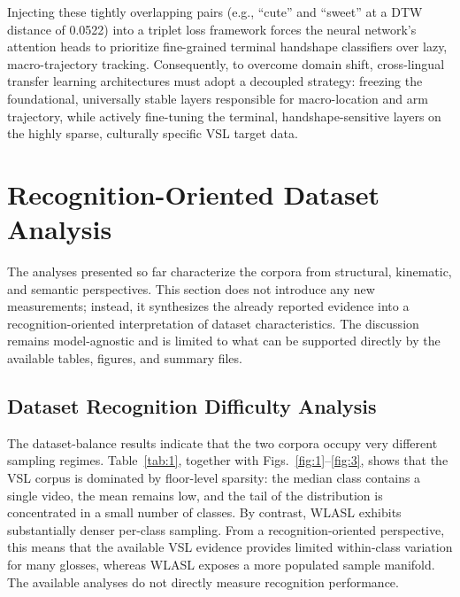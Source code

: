 \documentclass{ieeeaccess}
\begin{document}
Injecting these tightly overlapping pairs (e.g., ``cute'' and ``sweet'' at a DTW distance of 0.0522) into a triplet loss framework forces the neural network's attention heads to prioritize fine-grained terminal handshape classifiers over lazy, macro-trajectory tracking. Consequently, to overcome domain shift, cross-lingual transfer learning architectures must adopt a decoupled strategy: freezing the foundational, universally stable layers responsible for macro-location and arm trajectory, while actively fine-tuning the terminal, handshape-sensitive layers on the highly sparse, culturally specific VSL target data.

\section{Recognition-Oriented Dataset Analysis}
\label{sec:recognition_oriented_dataset_analysis}

The analyses presented so far characterize the corpora from structural, kinematic, and semantic perspectives. This section does not introduce any new measurements; instead, it synthesizes the already reported evidence into a recognition-oriented interpretation of dataset characteristics. The discussion remains model-agnostic and is limited to what can be supported directly by the available tables, figures, and summary files.

\subsection{Dataset Recognition Difficulty Analysis}
The dataset-balance results indicate that the two corpora occupy very different sampling regimes. Table~\ref{tab:1}, together with Figs.~\ref{fig:1}--\ref{fig:3}, shows that the VSL corpus is dominated by floor-level sparsity: the median class contains a single video, the mean remains low, and the tail of the distribution is concentrated in a small number of classes. By contrast, WLASL exhibits substantially denser per-class sampling. From a recognition-oriented perspective, this means that the available VSL evidence provides limited within-class variation for many glosses, whereas WLASL exposes a more populated sample manifold. The available analyses do not directly measure recognition performance.
\end{document}
